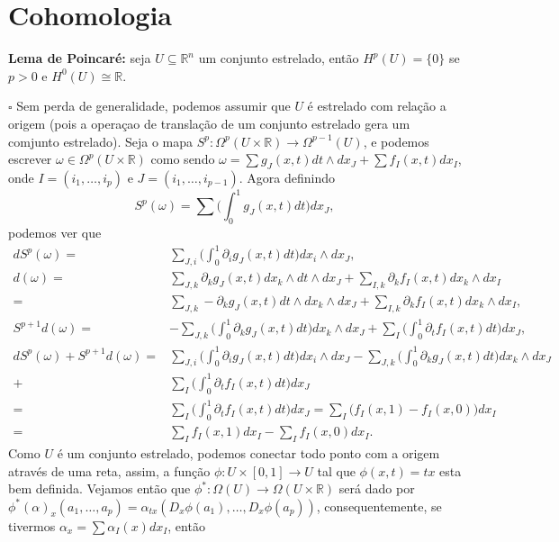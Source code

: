 \documentclass{article}
\begin{document}
	\section{Cohomologia}
	
	\textbf{Lema de Poincaré:} seja $U \subseteq \mathbb{R}^{n}$ um conjunto estrelado, então $H^{p}(U) = \{0\}$ se $p>0$ e $H^{0}(U) \cong \mathbb{R}$.
	
	$\square$ Sem perda de generalidade, podemos assumir que $U$ é estrelado com relação a origem (pois a operaçao de translação de um conjunto estrelado gera um comjunto estrelado). Seja o mapa $S^{p}: \Omega^{p}(U \times \mathbb{R}) \to \Omega^{p-1}(U)$, e podemos escrever $\omega \in \Omega^{p}(U \times \mathbb{R}) $ como sendo $\omega = \sum g_{J}(x,t)dt \wedge dx_{J} + \sum f_{I}(x,t)dx_{I}$, onde $I=(i_{1}, \dots ,i_{p})$ e $J=(i_{1}, \dots ,i_{p-1})$. Agora definindo
	$$
	S^{p}(\omega) = \sum \Big( \int_{0}^{1} g_{J}(x,t)dt \Big) dx_{J},
	$$
	podemos ver que
	$$
	\begin{aligned}
	dS^{p}(\omega) =& \sum_{J,i} \Big( \int_{0}^{1} \partial_{i} g_{J}(x,t)dt \Big) dx_{i} \wedge dx_{J},
	\\
	d(\omega) =& \sum_{J,k} \partial_{k} g_{J}(x,t) dx_{k} \wedge dt \wedge dx_{J} + \sum_{I,k} \partial_{k} f_{I}(x,t) dx_{k} \wedge dx_{I}
	\\
	 =& \sum_{J,k} -\partial_{k} g_{J}(x,t) dt \wedge dx_{k} \wedge dx_{J} + \sum_{I,k} \partial_{k} f_{I}(x,t) dx_{k} \wedge dx_{I},
	 \\
	 S^{p+1}d(\omega) =&  -\sum_{J,k} \Big( \int_{0}^{1}  \partial_{k} g_{J}(x,t)dt \Big) dx_{k} \wedge dx_{J} + \sum_{I} \Big( \int_{0}^{1}  \partial_{t} f_{I}(x,t)dt \Big) dx_{J},
	 \\
	  d S^{p}(\omega) + S^{p+1}d(\omega) =& \sum_{J,i} \Big( \int_{0}^{1} \partial_{i} g_{J}(x,t)dt \Big) dx_{i} \wedge dx_{J} -\sum_{J,k} \Big( \int_{0}^{1}  \partial_{k} g_{J}(x,t)dt \Big) dx_{k} \wedge dx_{J} 
	  \\
	  +& \sum_{I} \Big( \int_{0}^{1}  \partial_{t} f_{I}(x,t)dt \Big) dx_{J}
	  \\
	  =& \sum_{I} \Big( \int_{0}^{1}  \partial_{t} f_{I}(x,t)dt \Big) dx_{J} = \sum_{I} \Big( f_{I}(x,1)  - f_{I}(x,0)\Big) dx_{I}
	  \\
	  =& \sum_{I} f_{I}(x,1) dx_{I} - \sum_{I} f_{I}(x,0) dx_{I}.
	\end{aligned}
	$$
	Como $U$ é um conjunto estrelado, podemos conectar todo ponto com a origem através de uma reta, assim, a função $\phi: U \times [0,1] \to U$ tal que $\phi(x,t) = tx$ esta bem definida. Vejamos então que $\phi^{*} : \Omega(U) \to \Omega(U \times \mathbb{R})$ será dado por $\phi^{*}(\alpha)_{x}(a_{1},\dots,a_{p}) = \alpha_{tx}(D_{x}\phi(a_{1}),\dots, D_{x}\phi(a_{p}))$, consequentemente, se tivermos $\alpha_{x} = \sum \alpha_{I}(x)dx_{I}$, então 
\end{document}
